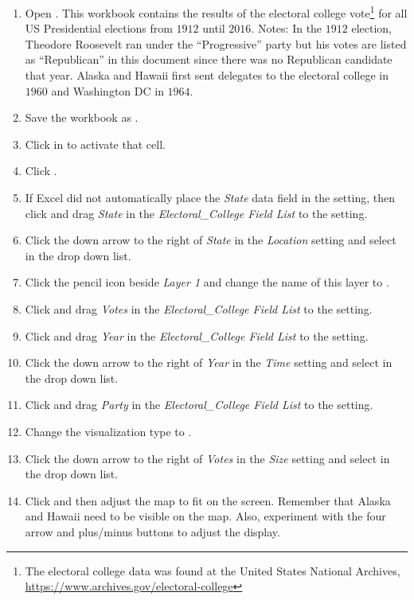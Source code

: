 \begin{enumerate}
	\item Open . This workbook contains the results of the electoral college vote\footnote{The electoral college data was found at the United States National Archives, \url{https://www.archives.gov/electoral-college}} for all US Presidential elections from $ 1912 $ until $ 2016 $. Notes: In the $ 1912 $ election, Theodore Roosevelt ran under the ``Progressive'' party but his votes are listed as ``Republican'' in this document since there was no Republican candidate that year. Alaska and Hawaii first sent delegates to the electoral college in $ 1960 $ and Washington DC in $ 1964 $.
	\item Save the workbook as .
	\item Click in  to activate that cell.
	\item Click .
	\item If Excel did not automatically place the \textit{State} data field in the  setting, then click and drag \textit{State} in the \textit{Electoral\_College Field List} to the  setting. 
	\item Click the down arrow to the right of \textit{State} in the \textit{Location} setting and select  in the drop down list.
	\item Click the pencil icon beside \textit{Layer 1} and change the name of this layer to .
	\item Click and drag \textit{Votes} in the \textit{Electoral\_College Field List} to the  setting.
	\item Click and drag \textit{Year} in the \textit{Electoral\_College Field List} to the  setting.
	\item Click the down arrow to the right of \textit{Year} in the \textit{Time} setting and select  in the drop down list.
	\item Click and drag \textit{Party} in the \textit{Electoral\_College Field List} to the  setting.
	\item Change the visualization type to .
	\item Click the down arrow to the right of \textit{Votes} in the \textit{Size} setting and select  in the drop down list.
	\item Click  and then adjust the map to fit on the screen. Remember that Alaska and Hawaii need to be visible on the map. Also, experiment with the four arrow and plus/minus buttons to adjust the display.

\end{enumerate}
